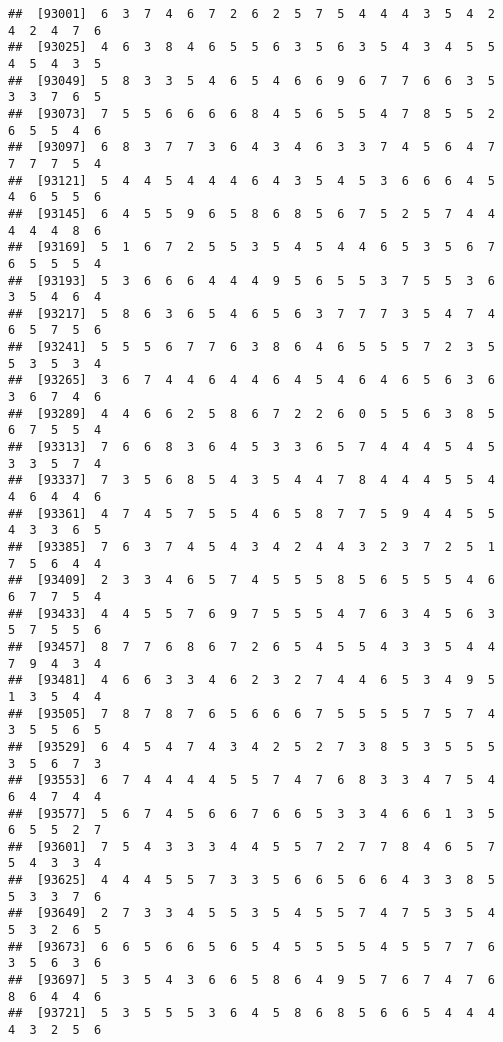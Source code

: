 \documentclass[
]{book}
\begin{document}
\begin{verbatim}
##  [93001]  6  3  7  4  6  7  2  6  2  5  7  5  4  4  4  3  5  4  2  4  2  4  7  6
##  [93025]  4  6  3  8  4  6  5  5  6  3  5  6  3  5  4  3  4  5  5  4  5  4  3  5
##  [93049]  5  8  3  3  5  4  6  5  4  6  6  9  6  7  7  6  6  3  5  3  3  7  6  5
##  [93073]  7  5  5  6  6  6  6  8  4  5  6  5  5  4  7  8  5  5  2  6  5  5  4  6
##  [93097]  6  8  3  7  7  3  6  4  3  4  6  3  3  7  4  5  6  4  7  7  7  7  5  4
##  [93121]  5  4  4  5  4  4  4  6  4  3  5  4  5  3  6  6  6  4  5  4  6  5  5  6
##  [93145]  6  4  5  5  9  6  5  8  6  8  5  6  7  5  2  5  7  4  4  4  4  4  8  6
##  [93169]  5  1  6  7  2  5  5  3  5  4  5  4  4  6  5  3  5  6  7  6  5  5  5  4
##  [93193]  5  3  6  6  6  4  4  4  9  5  6  5  5  3  7  5  5  3  6  3  5  4  6  4
##  [93217]  5  8  6  3  6  5  4  6  5  6  3  7  7  7  3  5  4  7  4  6  5  7  5  6
##  [93241]  5  5  5  6  7  7  6  3  8  6  4  6  5  5  5  7  2  3  5  5  3  5  3  4
##  [93265]  3  6  7  4  4  6  4  4  6  4  5  4  6  4  6  5  6  3  6  3  6  7  4  6
##  [93289]  4  4  6  6  2  5  8  6  7  2  2  6  0  5  5  6  3  8  5  6  7  5  5  4
##  [93313]  7  6  6  8  3  6  4  5  3  3  6  5  7  4  4  4  5  4  5  3  3  5  7  4
##  [93337]  7  3  5  6  8  5  4  3  5  4  4  7  8  4  4  4  5  5  4  4  6  4  4  6
##  [93361]  4  7  4  5  7  5  5  4  6  5  8  7  7  5  9  4  4  5  5  4  3  3  6  5
##  [93385]  7  6  3  7  4  5  4  3  4  2  4  4  3  2  3  7  2  5  1  7  5  6  4  4
##  [93409]  2  3  3  4  6  5  7  4  5  5  5  8  5  6  5  5  5  4  6  6  7  7  5  4
##  [93433]  4  4  5  5  7  6  9  7  5  5  5  4  7  6  3  4  5  6  3  5  7  5  5  6
##  [93457]  8  7  7  6  8  6  7  2  6  5  4  5  5  4  3  3  5  4  4  7  9  4  3  4
##  [93481]  4  6  6  3  3  4  6  2  3  2  7  4  4  6  5  3  4  9  5  1  3  5  4  4
##  [93505]  7  8  7  8  7  6  5  6  6  6  7  5  5  5  5  7  5  7  4  3  5  5  6  5
##  [93529]  6  4  5  4  7  4  3  4  2  5  2  7  3  8  5  3  5  5  5  3  5  6  7  3
##  [93553]  6  7  4  4  4  4  5  5  7  4  7  6  8  3  3  4  7  5  4  6  4  7  4  4
##  [93577]  5  6  7  4  5  6  6  7  6  6  5  3  3  4  6  6  1  3  5  6  5  5  2  7
##  [93601]  7  5  4  3  3  3  4  4  5  5  7  2  7  7  8  4  6  5  7  5  4  3  3  4
##  [93625]  4  4  4  5  5  7  3  3  5  6  6  5  6  6  4  3  3  8  5  5  3  3  7  6
##  [93649]  2  7  3  3  4  5  5  3  5  4  5  5  7  4  7  5  3  5  4  5  3  2  6  5
##  [93673]  6  6  5  6  6  5  6  5  4  5  5  5  5  4  5  5  7  7  6  3  5  6  3  6
##  [93697]  5  3  5  4  3  6  6  5  8  6  4  9  5  7  6  7  4  7  6  8  6  4  4  6
##  [93721]  5  3  5  5  5  3  6  4  5  8  6  8  5  6  6  5  4  4  4  4  3  2  5  6

\end{verbatim}
\end{document}
